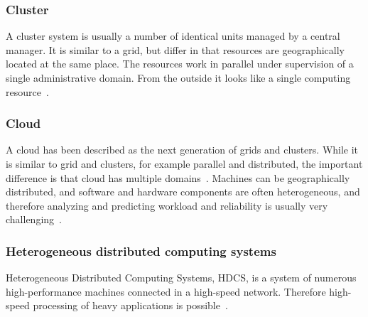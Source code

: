 \documentclass{cslthse-msc}
\begin{document}

\subsubsection{Cluster}
A cluster system is usually a number of identical units managed by a central manager. It is similar to a grid, but differ in that resources are geographically located at the same place. The resources work in parallel under supervision of a single administrative domain. From the outside it looks like a single computing resource~\cite{compStudyLoadAndCloud}.

\subsubsection{Cloud}
A cloud has been described as the next generation of grids and clusters. While it is similar to grid and clusters, for example parallel and distributed, the important difference is that cloud has multiple domains~\cite{compStudyLoadAndCloud}. Machines can be geographically distributed, and software and hardware components are often heterogeneous, and therefore analyzing and predicting workload and reliability is usually very challenging~\cite{surveyReliabilityDistr}. 



\subsubsection{Heterogeneous distributed computing systems}
Heterogeneous Distributed Computing Systems, HDCS, is a system of numerous high-performance machines connected in a high-speed network. Therefore high-speed processing of heavy applications is possible~\cite{algoMinExTime}. %
\end{document}
